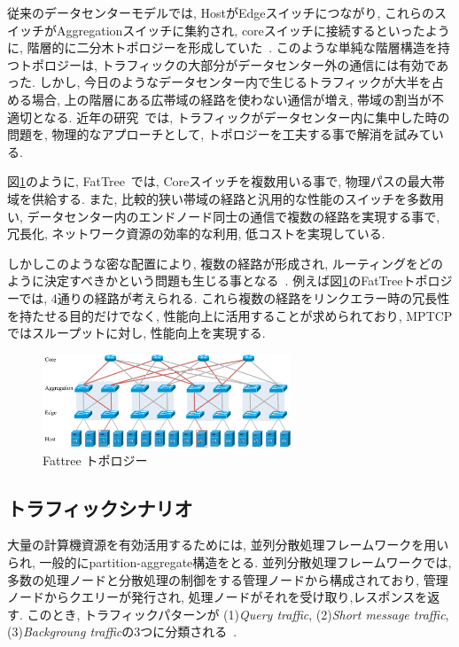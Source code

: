 \documentclass[11pt, a4paper, twocolumn]{jsarticle}
\begin{document}
従来のデータセンターモデルでは, HostがEdgeスイッチにつながり,
これらのスイッチがAggregationスイッチに集約され,
coreスイッチに接続するといったように, 階層的に二分木トポロジーを形成していた~\cite{fattree}.
このような単純な階層構造を持つトポロジーは, トラフィックの大部分がデータセンター外の通信には有効であった.
しかし, 今日のようなデータセンター内で生じるトラフィックが大半を占める場合, 上の階層にある広帯域の経路を使わない通信が増え, 帯域の割当が不適切となる.
近年の研究~\cite{fattree}では, トラフィックがデータセンター内に集中した時の問題を, 物理的なアプローチとして,
トポロジーを工夫する事で解消を試みている.

図\ref{fig:fattree}のように, FatTree~\cite{fattree}では, Coreスイッチを複数用いる事で,
物理パスの最大帯域を供給する.
また, 比較的狭い帯域の経路と汎用的な性能のスイッチを多数用い, データセンター内のエンドノード同士の通信で複数の経路を実現する事で, 冗長化,
ネットワーク資源の効率的な利用, 低コストを実現している.

しかしこのような密な配置により, 複数の経路が形成され, ルーティングをどのように決定すべきかという問題も生じる事となる~\cite{improving}.
例えば図\ref{fig:fattree}のFatTreeトポロジーでは, 4通りの経路が考えられる.
これら複数の経路をリンクエラー時の冗長性を持たせる目的だけでなく, 性能向上に活用することが求められており, MPTCPではスループットに対し,
性能向上を実現する\cite{improving}.
 \begin{figure}[h]
    \begin{center}
    \includegraphics[autoebb, width=210pt]{./img/fattree_topology.pdf}
    \caption{Fattree トポロジー}
    \label{fig:fattree}
    \end{center}
\end{figure}

\subsection{トラフィックシナリオ}
\label{sec:traffic_scenario}
大量の計算機資源を有効活用するためには,
並列分散処理フレームワークを用いられ, 一般的にpartition-aggregate構造をとる.
並列分散処理フレームワークでは, 多数の処理ノードと分散処理の制御をする管理ノードから構成されており, 管理ノードからクエリーが発行され,
処理ノードがそれを受け取り,レスポンスを返す.
このとき, トラフィックパターンが  (1){\it Query traffic}, (2){\it Short message
traffic}, (3){\it Backgroung traffic}の3つに分類される~\cite{dctcp}.
\end{document}
